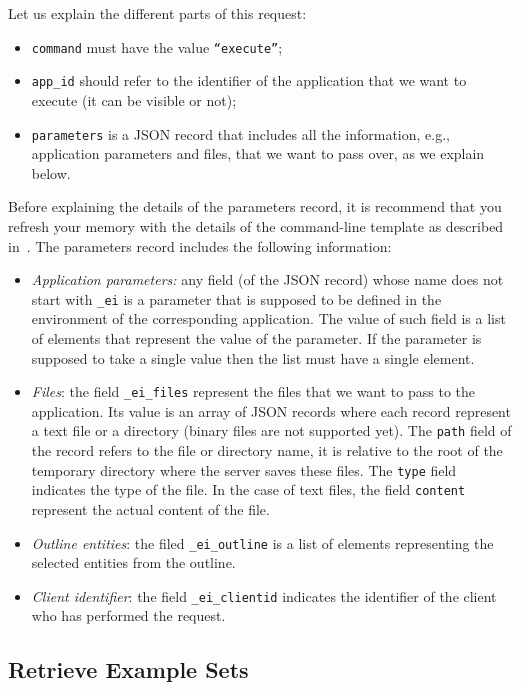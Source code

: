 \bigskip
\noindent
Let us explain the different parts of this request: 
%
\begin{itemize}
%
\item \texttt{command} must have the value \texttt{``execute''};
%
\item \texttt{app\_id} should refer to the identifier of the
  application that we want to execute (it can be visible or not);
%
\item \texttt{parameters} is a JSON record that includes all the
  information, e.g., application parameters and files, that we want to
  pass over, as we explain below.
\end{itemize}
%
Before explaining the details of the parameters record, it is
recommend that you refresh your memory with the details of the
command-line template as described
in~. The parameters record includes
the following information:
%
\begin{itemize}
%
\item \emph{Application parameters:} any field (of the JSON record)
  whose name does not start with \texttt{\_ei} is a parameter that is
  supposed to be defined in the 
  environment of the corresponding application. The value of such
  field is a list of elements that represent the value of the
  parameter. If the parameter is supposed to take a single value then
  the list must have a single element.
%
\item \emph{Files}: the field \texttt{\_ei\_files} represent the files
  that we want to pass to the application. Its value is an array of
  JSON records where each record represent a text file or a directory
  (binary files are not supported yet). The \texttt{path} field of the
  record refers to the file or directory name, it is relative to the
  root of the temporary directory where the server saves these
  files. The \texttt{type} field indicates the type of the file. In
  the case of text files, the field \texttt{content} represent the
  actual content of the file.
%
\item \emph{Outline entities}: the filed \texttt{\_ei\_outline} is a
  list of elements representing the selected entities from the
  outline.
%
\item \emph{Client identifier}: the field \texttt{\_ei\_clientid}
  indicates the identifier of the client who has performed the
  request.
%
\end{itemize}



\subsection{Retrieve Example Sets}

